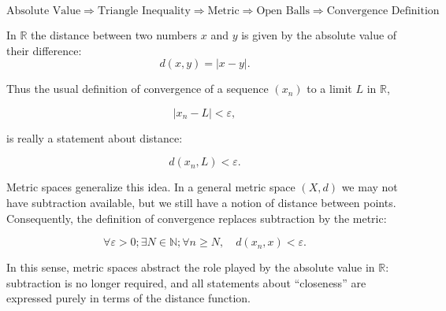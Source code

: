 \begin{remark}
\[
\text{Absolute Value}
\Rightarrow
\text{Triangle Inequality}
\Rightarrow
\text{Metric}
\Rightarrow
\text{Open Balls}
\Rightarrow
\text{Convergence Definition}
\]
\end{remark}






\begin{remark}
In $\mathbb{R}$ the distance between two numbers $x$ and $y$ is given by the
absolute value of their difference:
\[
d(x,y) = |x-y|.
\]

Thus the usual definition of convergence of a sequence $(x_n)$ to a limit $L$
in $\mathbb{R}$,

\[
|x_n - L| < \varepsilon,
\]

is really a statement about distance:

\[
d(x_n,L) < \varepsilon.
\]

Metric spaces generalize this idea. In a general metric space $(X,d)$ we may
not have subtraction available, but we still have a notion of distance between
points. Consequently, the definition of convergence replaces subtraction by
the metric:

\[
\forall \varepsilon > 0;\exists N \in \mathbb{N};
\forall n \ge N,\quad d(x_n,x) < \varepsilon.
\]

In this sense, metric spaces abstract the role played by the absolute value in
$\mathbb{R}$: subtraction is no longer required, and all statements about
``closeness'' are expressed purely in terms of the distance function.
\end{remark}


